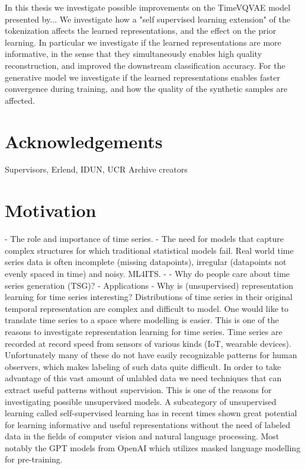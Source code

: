 \documentclass[../../thesis.tex]{subfiles}
\begin{document}
In this thesis we investigate possible improvements on the TimeVQVAE model presented by... We investigate how a "self supervised learning extension" of the tokenization affects the learned representations, and the effect on the prior learning. In particular we investigate if the learned representations are more informative, in the sense that they simultaneously enables high quality reconstruction, and improved the downstream classification accuracy. For the generative model we investigate if the learned representations enables faster convergence during training, and how the quality of the synthetic samples are affected. \\

\section{Acknowledgements}
Supervisors, Erlend, IDUN, UCR Archive creators

\section{Motivation}
	- The role and importance of time series.
	- The need for models that capture complex structures for which traditional statistical models fail. 
Real world time series data is often incomplete (missing datapoints), irregular (datapoints not evenly spaced in time) and noisy. 
	ML4ITS. 
	- 
	- Why do people care about time series generation (TSG)?
		- Applications
	- Why is (unsupervised) representation learning for time series interesting?
Distributions of time series in their original temporal representation are complex and difficult to model. One would like to translate time series to a space where modelling is easier. This is one of the reasons to investigate representation learning for time series. Time series are recorded at record speed from sensors of various kinds (IoT, wearable devices). Unfortunately many of these do not have easily recognizable patterns for human observers, which makes labeling of such data quite difficult. In order to take advantage of this vast amount of unlabled data we need techniques that can extract useful patterns without supervision. This is one of the reasons for investigating possible unsupervised models. A subcategory of unsupervised learning called self-supervised learning has in recent times shown great potential for learning informative and useful representations without the need of labeled data in the fields of computer vision and natural language processing. Most notably the GPT models from OpenAI which utilizes masked language modelling for pre-training. 
\end{document}
